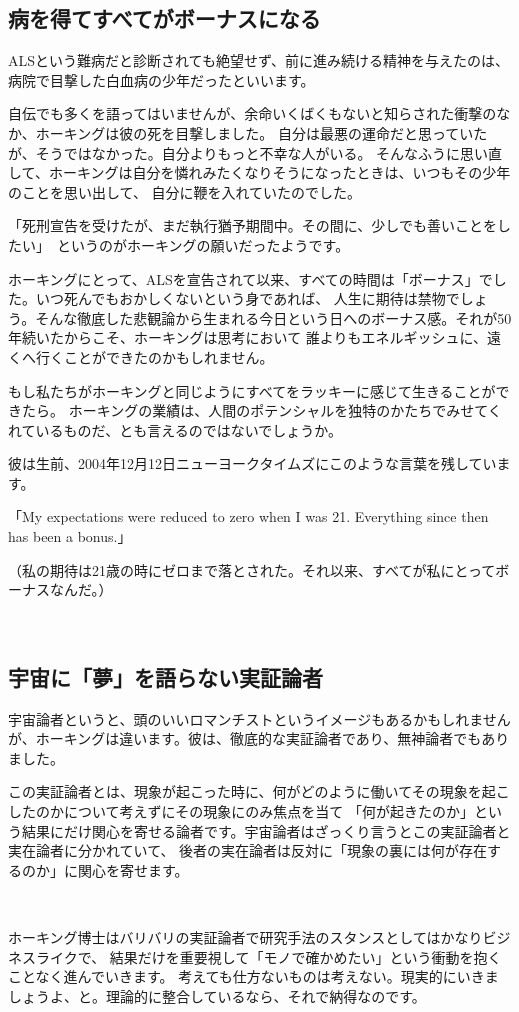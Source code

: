 \documentclass[10pt,b5paper,papersize,dvipdfmx]{jsbook}
\begin{document}
\subsection{病を得てすべてがボーナスになる}
ALSという難病だと診断されても絶望せず、前に進み続ける精神を与えたのは、病院で目撃した白血病の少年だったといいます。\par
自伝でも多くを語ってはいませんが、余命いくばくもないと知らされた衝撃のなか、ホーキングは彼の死を目撃しました。
自分は最悪の運命だと思っていたが、そうではなかった。自分よりもっと不幸な人がいる。
そんなふうに思い直して、ホーキングは自分を憐れみたくなりそうになったときは、いつもその少年のことを思い出して、
自分に鞭を入れていたのでした。\par
「死刑宣告を受けたが、まだ執行猶予期間中。その間に、少しでも善いことをしたい」\,
というのがホーキングの願いだったようです。\par
ホーキングにとって、ALSを宣告されて以来、すべての時間は「ボーナス」でした。いつ死んでもおかしくないという身であれば、
人生に期待は禁物でしょう。そんな徹底した悲観論から生まれる今日という日へのボーナス感。それが50年続いたからこそ、ホーキングは思考において
誰よりもエネルギッシュに、遠くへ行くことができたのかもしれません。\par
もし私たちがホーキングと同じようにすべてをラッキーに感じて生きることができたら。
ホーキングの業績は、人間のポテンシャルを独特のかたちでみせてくれているものだ、とも言えるのではないでしょうか。\par
彼は生前、2004年12月12日ニューヨークタイムズにこのような言葉を残しています。\par
「My expectations were reduced to zero when I was 21. Everything since then has been a bonus.」\par
（私の期待は21歳の時にゼロまで落とされた。それ以来、すべてが私にとってボーナスなんだ。）\par
\,\par

\subsection{宇宙に「夢」を語らない実証論者}
宇宙論者というと、頭のいいロマンチストというイメージもあるかもしれませんが、ホーキングは違います。彼は、徹底的な実証論者であり、無神論者でもありました。\par
この実証論者とは、現象が起こった時に、何がどのように働いてその現象を起こしたのかについて考えずにその現象にのみ焦点を当て
「何が起きたのか」という結果にだけ関心を寄せる論者です。宇宙論者はざっくり言うとこの実証論者と実在論者に分かれていて、
後者の実在論者は反対に「現象の裏には何が存在するのか」に関心を寄せます。\par
\,\par
ホーキング博士はバリバリの実証論者で研究手法のスタンスとしてはかなりビジネスライクで、
結果だけを重要視して「モノで確かめたい」という衝動を抱くことなく進んでいきます。
考えても仕方ないものは考えない。現実的にいきましょうよ、と。理論的に整合しているなら、それで納得なのです。\par
\end{document}
